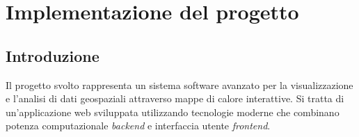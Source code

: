 \chapter{Implementazione del progetto}
\label{ch:implementazione}

\section{Introduzione}

Il progetto svolto rappresenta un sistema software avanzato per la visualizzazione e l'analisi di dati geospaziali attraverso mappe di calore interattive. Si tratta di un'applicazione web sviluppata utilizzando tecnologie moderne che combinano potenza computazionale \textit{backend} e interfaccia utente \textit{frontend}.



\newpage



\newpage

